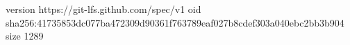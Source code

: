 version https://git-lfs.github.com/spec/v1
oid sha256:41735853dc077ba472309d90361f763789eaf027b8cdef303a040ebc2bb3b904
size 1289
